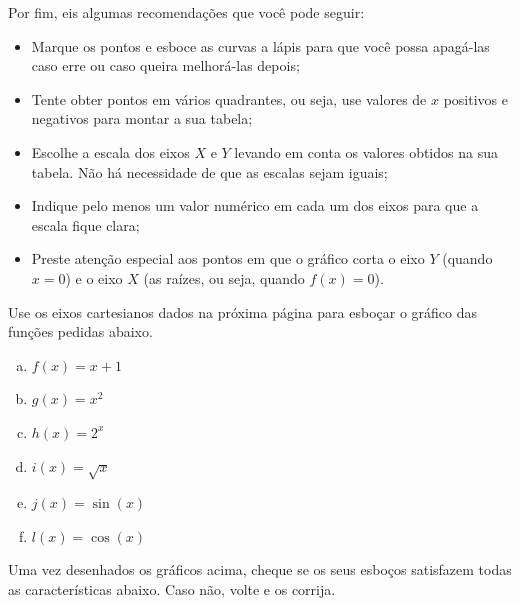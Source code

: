 \documentclass[main_estudante.tex]{subfiles}
\begin{document}
Por fim, eis algumas recomendações que você pode seguir:

\begin{itemize}
 \item Marque os pontos e esboce as curvas a lápis para que você possa apagá-las caso erre ou caso queira melhorá-las depois;
 \item Tente obter pontos em vários quadrantes, ou seja, use valores de $x$ positivos e negativos para montar a sua tabela;
 \item Escolhe a escala dos eixos $X$ e $Y$ levando em conta os valores obtidos na sua tabela. Não há necessidade de que as escalas sejam iguais;
 \item Indique pelo menos um valor numérico em cada um dos eixos para que a escala fique clara;
 \item Preste atenção especial aos pontos em que o gráfico corta o eixo $Y$ (quando $x=0$) e o eixo $X$ (as raízes, ou seja, quando $f(x)=0$).
\end{itemize}

\newpage

\begin{questao}
Use os eixos cartesianos dados na próxima página para  esboçar o gráfico das funções pedidas abaixo.
\begin{enumerate}[a)]
\item $f(x)=x+1$
\item $g(x)=x^2$
\item $h(x)=2^x$
\item $i(x)=\sqrt{x}$
\item $j(x)=\sin(x)$
\item $l(x)=\cos(x)$
\end{enumerate}
\end{questao}

Uma vez desenhados os gráficos acima, cheque se os seus esboços satisfazem todas as características abaixo. Caso não, volte e os corrija.
\end{document}
